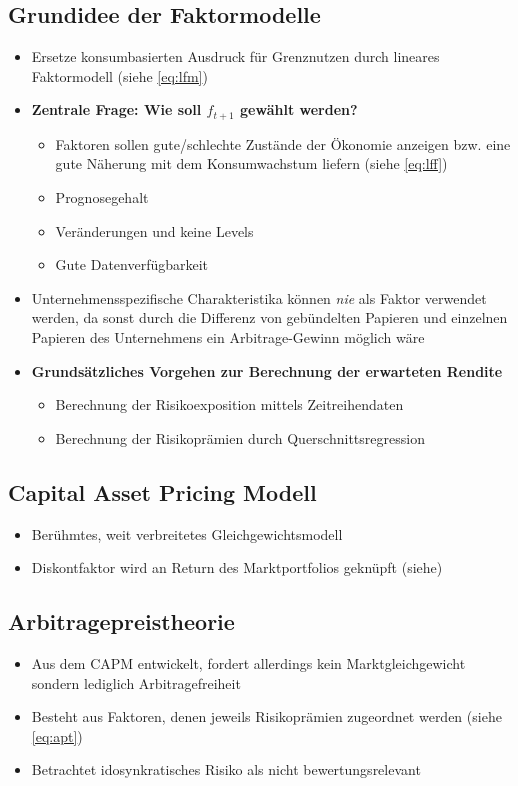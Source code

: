 \subsection{Grundidee der Faktormodelle}
\begin{itemize}
	\item Ersetze konsumbasierten Ausdruck für Grenznutzen durch lineares Faktormodell (siehe \ref{eq:lfm})
	\item \textbf{Zentrale Frage: Wie soll \(f_{t+1}\) gewählt werden?}
	\begin{itemize}
		\item Faktoren sollen gute/schlechte Zustände der Ökonomie anzeigen bzw. eine gute Näherung mit dem Konsumwachstum liefern (siehe \ref{eq:lff})
		\item Prognosegehalt
		\item Veränderungen und keine Levels
		\item Gute Datenverfügbarkeit
	\end{itemize}
	\item Unternehmensspezifische Charakteristika können \textit{nie} als Faktor verwendet werden, da sonst durch die Differenz von gebündelten Papieren und einzelnen Papieren des Unternehmens ein Arbitrage-Gewinn möglich wäre
	\item \textbf{Grundsätzliches Vorgehen zur Berechnung der erwarteten Rendite}
	\begin{itemize}
		\item Berechnung der Risikoexposition mittels Zeitreihendaten
		\item Berechnung der Risikoprämien durch Querschnittsregression
	\end{itemize}
\end{itemize}


\subsection{Capital Asset Pricing Modell}
\begin{itemize}
	\item Berühmtes, weit verbreitetes Gleichgewichtsmodell
	\item Diskontfaktor wird an Return des Marktportfolios geknüpft (siehe)
\end{itemize}


\subsection{Arbitragepreistheorie}
\begin{itemize}
	\item Aus dem CAPM entwickelt, fordert allerdings kein Marktgleichgewicht sondern lediglich Arbitragefreiheit
	\item Besteht aus Faktoren, denen jeweils Risikoprämien zugeordnet werden (siehe \ref{eq:apt})
	\item Betrachtet idosynkratisches Risiko als nicht bewertungsrelevant
\end{itemize}


